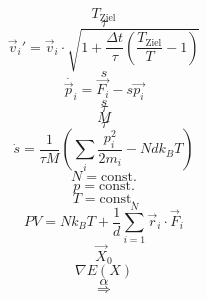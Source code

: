 \documentclass{scrreprt}
\begin{document}
\begin{equation}
T_\text{Ziel}
\end{equation}
\begin{equation}
\tau
\end{equation}
\begin{equation}
  \vec v_i' = \vec v_i \cdot \sqrt{1 + \frac{\Delta t}{\tau} \left(\frac{T_\text{Ziel}}{T} - 1\right)}
\end{equation}
\begin{equation}
s
\end{equation}
\begin{equation}
  \dot{\vec p_i} = \vec{F_i} - s \vec{p_i}
\end{equation}
\begin{equation}
s
\end{equation}
\begin{equation}
\tau
\end{equation}
\begin{equation}
M
\end{equation}
\begin{equation}
\tau
\end{equation}
\begin{equation}
  \dot s = \frac{1}{\tau M} \left(\sum_i{\frac{p_i^2}{2m_i}} - N d k_B T\right)
\end{equation}
\begin{equation}
  N = \text{const.}
\end{equation}
\begin{equation}
  \qquad
\end{equation}
\begin{equation}
  p = \text{const.}
\end{equation}
\begin{equation}
  \qquad
\end{equation}
\begin{equation}
  T = \text{const.}
\end{equation}
\begin{equation}
  PV = N k_B T + \frac{1}{d} \sum_{i=1}^N{\vec{r}_i \cdot \vec{F}_i}
\end{equation}
\begin{equation}
\vec X_0
\end{equation}
\begin{equation}
\nabla E(X)
\end{equation}
\begin{equation}
\alpha
\end{equation}
\begin{equation}
\Rightarrow
\end{equation}
\end{document}
